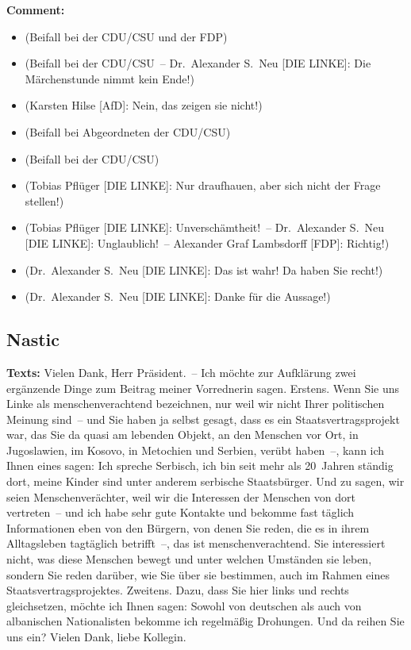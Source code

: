 \documentclass{article}
\begin{document}
\noindent\textbf{Comment:}
\begin{itemize}
    \setlength\itemsep{-3pt}
    \item (Beifall bei der CDU/CSU und der FDP)
    \setlength\itemsep{-3pt}
    \item (Beifall bei der CDU/CSU – Dr. Alexander S. Neu [DIE LINKE]: Die Märchenstunde nimmt kein Ende!)
    \setlength\itemsep{-3pt}
    \item (Karsten Hilse [AfD]: Nein, das zeigen sie nicht!)
    \setlength\itemsep{-3pt}
    \item (Beifall bei Abgeordneten der CDU/CSU)
    \setlength\itemsep{-3pt}
    \item (Beifall bei der CDU/CSU)
    \setlength\itemsep{-3pt}
    \item (Tobias Pflüger [DIE LINKE]: Nur draufhauen, aber sich nicht der Frage stellen!)
    \setlength\itemsep{-3pt}
    \item (Tobias Pflüger [DIE LINKE]: Unverschämtheit! – Dr. Alexander S. Neu [DIE LINKE]: Unglaublich! – Alexander Graf Lambsdorff [FDP]: Richtig!)
    \setlength\itemsep{-3pt}
    \item (Dr. Alexander S. Neu [DIE LINKE]: Das ist wahr! Da haben Sie recht!)
    \setlength\itemsep{-3pt}
    \item (Dr. Alexander S. Neu [DIE LINKE]: Danke für die Aussage!)
\end{itemize}
\subsection{Nastic}
\noindent\textbf{Texts:} Vielen Dank, Herr Präsident. – Ich möchte zur Aufklärung zwei ergänzende Dinge zum Beitrag meiner Vorrednerin sagen. Erstens. Wenn Sie uns Linke als menschenverachtend bezeichnen, nur weil wir nicht Ihrer politischen Meinung sind – und Sie haben ja selbst gesagt, dass es ein Staatsvertragsprojekt war, das Sie da quasi am lebenden Objekt, an den Menschen vor Ort, in Jugoslawien, im Kosovo, in Metochien und Serbien, verübt haben –, kann ich Ihnen eines sagen: Ich spreche Serbisch, ich bin seit mehr als 20 Jahren ständig dort, meine Kinder sind unter anderem serbische Staatsbürger. Und zu sagen, wir seien Menschenverächter, weil wir die Interessen der Menschen von dort vertreten – und ich habe sehr gute Kontakte und bekomme fast täglich Informationen eben von den Bürgern, von denen Sie reden, die es in ihrem Alltagsleben tagtäglich betrifft –, das ist menschenverachtend. Sie interessiert nicht, was diese Menschen bewegt und unter welchen Umständen sie leben, sondern Sie reden darüber, wie Sie über sie bestimmen, auch im Rahmen eines Staatsvertragsprojektes. Zweitens. Dazu, dass Sie hier links und rechts gleichsetzen, möchte ich Ihnen sagen: Sowohl von deutschen als auch von albanischen Nationalisten bekomme ich regelmäßig Drohungen. Und da reihen Sie uns ein? Vielen Dank, liebe Kollegin.
\end{document}
